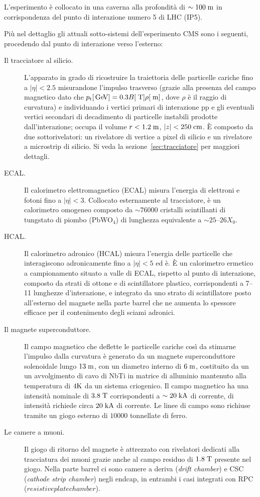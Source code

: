 L’esperimento \`e collocato in una caverna alla profondit\`a di $\sim 100 \rm \; m$ in corrispondenza del punto di interazione numero 5 di LHC (IP5). 

Pi\`u nel dettaglio gli attuali sotto-sistemi dell'esperimento CMS sono i seguenti, procedendo dal punto di interazione verso l'esterno:

\begin{description}
\item[Il tracciatore al silicio.] L'apparato in grado di ricostruire la traiettoria delle particelle cariche fino a $|\eta|<2.5$ misurandone l'impulso trasverso (grazie alla presenza del campo magnetico dato che ${p_{\rm t}} [{\rm \, Ge\kern-0.125em V}] = 0.3 B [\rm \; T] \rho [\rm \; m]$, dove $\rho$ \`e il raggio di curvatura) e individuando i vertici primari di interazione pp e gli eventuali vertici secondari di decadimento di particelle instabili prodotte dall'interazione; occupa il volume $r<1.2\rm \; m$, $|z|<250\rm \; cm$. \`E composto da due sottorivelatori: un rivelatore di vertice a pixel di silicio e un rivelatore a microstrip di silicio. Si veda la sezione~\ref{sec:tracciatore} per maggiori dettagli.
\item[ECAL.] Il calorimetro elettromagnetico (ECAL) misura l’energia di elettroni e fotoni fino a $|\eta|<3$. Collocato esternamente al tracciatore, \`e un calorimetro omogeneo composto da $\sim 76000$ cristalli scintillanti di tungstato di piombo (PbWO$_4$) di lunghezza equivalente a $\sim 25$--$26X_0$.
\item[HCAL.] Il calorimetro adronico (HCAL) misura l'energia delle particelle che interagiscono adronicamente fino a $|\eta|<5$ ed \`e. \`E un calorimetro ermetico a campionamento situato a valle di ECAL, rispetto al punto di interazione, composto da strati di ottone e di scintillatore plastico, corrispondenti a 7--11 lunghezze d'interazione, e integrato da uno strato di scintillatore posto all'esterno del magnete nella parte barrel che ne aumenta lo spessore efficace per il contenimento degli sciami adronici.
\item[Il magnete superconduttore.] Il campo magnetico che deflette le particelle cariche cos\`i da stimarne l’impulso dalla curvatura \`e generato da un magnete superconduttore solenoidale lungo $13\rm \; m$, con un diametro interno di $6\rm \; m$, costituito da un un avvolgimento di cavo di NbTi in matrice di alluminio mantenuto alla temperatura di $4{\mathrm K}$ da un sistema criogenico. Il campo magnetico ha una intensit\`a nominale di $3.8\rm \; T$ corrispondenti a $\sim 20\rm \; kA$ di corrente,  di intensit\`a richiede circa $20\rm \; kA$ di corrente. Le linee di campo sono richiuse tramite un giogo esterno di $10000$ tonnellate di ferro.
\item[Le camere a muoni.] Il giogo di ritorno del magnete \`e attrezzato con rivelatori dedicati alla tracciatura dei muoni grazie anche al campo residuo di $1.8\rm \; T$ presente nel giogo. Nella parte barrel ci sono camere a deriva ({\em drift chamber}) e CSC ({\em cathode strip chamber}) negli endcap, in entrambi i casi integrati con RPC ($resistive plate chamber$).  
\end{description}

